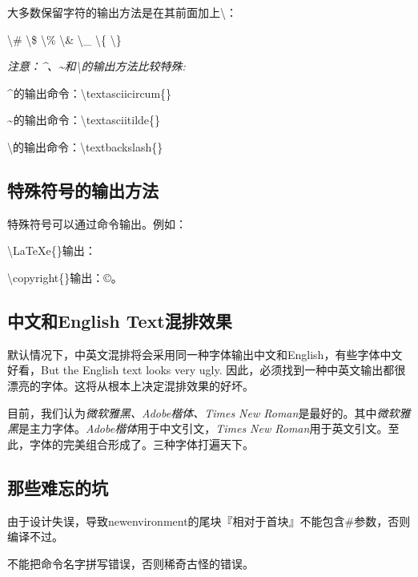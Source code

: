 大多数保留字符的输出方法是在其前面加上\textbackslash{}：

\textbackslash{}\# \qquad \textbackslash{}\$ \qquad \textbackslash{}\% \qquad \textbackslash{}\& \qquad \textbackslash{}\_ \qquad \textbackslash{}\{ \qquad \textbackslash{}\}

\emph{注意：\textasciicircum{}、\textasciitilde{}和\textbackslash{}的输出方法比较特殊:}

\textasciicircum{}的输出命令：\textbackslash{}textasciicircum\{\}

\textasciitilde{}的输出命令：\textbackslash{}textasciitilde\{\}

\textbackslash{}的输出命令：\textbackslash{}textbackslash\{\}

\subsection{特殊符号的输出方法}

特殊符号可以通过命令输出。例如：

\textbackslash{}LaTeXe\{\}输出：\LaTeXe{}

\textbackslash{}copyright\{\}输出：\copyright{}。

\subsection{中文和English Text混排效果}
\label{subsec:chinese_mix_english}

默认情况下，中英文混排将会采用同一种字体输出中文和English，有些字体中文好看，But the English text looks very ugly. 因此，必须找到一种中英文输出都很漂亮的字体。这将从根本上决定混排效果的好坏。

目前，我们认为\emph{微软雅黑、Adobe楷体、Times New Roman}是最好的。其中\emph{微软雅黑}是主力字体。\emph{Adobe楷体}用于中文引文，\emph{Times New Roman}用于英文引文。至此，字体的完美组合形成了。三种字体打遍天下。

\subsection{那些难忘的坑}

由于设计失误，导致newenvironment的尾块『相对于首块』不能包含\#参数，否则编译不过。

不能把命令名字拼写错误，否则稀奇古怪的错误。